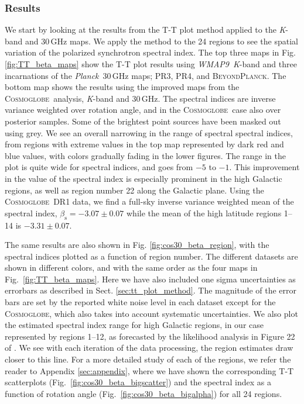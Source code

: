 \documentclass[twocolumn]{../../common/aa}
\def\WMAPnine{\emph{WMAP9}}
\def\Planck{\emph{Planck}}
\newcommand{\bp}{\textsc{BeyondPlanck}}
\newcommand{\cosmoglobe}{\textsc{Cosmoglobe}}
\newcommand{\K}[0]{\textit K}
\begin{document}
\subsubsection{Results}
\label{sec:tt_plot_results}

We start by looking at the results from the T-T plot method applied to the \K-band and 30\,GHz maps. We apply the method to the 24 regions to see the spatial variation of the polarized synchrotron spectral index. The top three maps in Fig. \ref{fig:TT_beta_maps} show the T-T plot results using \WMAPnine\ \K-band and three incarnations of the \Planck\ 30\,GHz maps; PR3, PR4, and \bp. The bottom map shows the results using the improved maps from the \cosmoglobe\ analysis, \K-band and 30\,GHz. The spectral indices are inverse variance weighted over rotation angle, and in the \cosmoglobe\ case also over posterior samples. Some of the brightest point sources have been masked out using grey. We see an overall narrowing in the range of spectral spectral indices, from regions with extreme values in the top map represented by dark red and blue values, with colors gradually fading in the lower figures. The range in the plot is quite wide for spectral indices, and goes from $-5$ to $-1$. This improvement in the value of the spectral index is especially prominent in the high Galactic regions, as well as region  number 22 along the Galactic plane.  Using the \cosmoglobe\ DR1 data, we find a full-sky inverse variance weighted mean of the spectral index, $\beta_{\mathrm{s}}=-3.07\pm0.07$ while the mean of the high latitude regions 1--14 is $-3.31\pm0.07$.

The same results are also shown in Fig. \ref{fig:cos30_beta_region}, with the spectral indices plotted as a function of region number. The different datasets are shown in different colors, and with the same order as the four maps in Fig.~\ref{fig:TT_beta_maps}. Here we have also included one sigma uncertainties as errorbars as described in Sect. \ref{sec:tt_plot_method}. The magnitude of the error bars are set by the reported white noise level in each dataset except for the \cosmoglobe, which also takes into account systematic uncertainties. We also plot the estimated spectral index range for high Galactic regions, in our case represented by regions 1--12, as forecasted by the likelihood analysis in Figure 22 of \citet{planck2016-l05}. We see with each iteration of the data processing, the region estimates draw closer to this line.
For a more detailed study of each of the regions, we refer the reader to Appendix \ref{sec:appendix}, where we have shown the corresponding T-T scatterplots (Fig.~\ref{fig:cos30_beta_bigscatter}) and the spectral index as a function of rotation angle (Fig.~\ref{fig:cos30_beta_bigalpha}) for all 24 regions.
\end{document}
